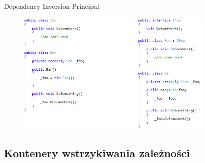 \documentclass{beamer}
\begin{document}
\begin{frame}{Dependency Inversion Principal}
\begin{figure}
	\begin{center}
  		\includegraphics[height=6cm]{PresentationDIP.png}
	\end{center}
\end{figure}
\end{frame}

\subsection*{Kontenery wstrzykiwania zależności}
\end{document}
